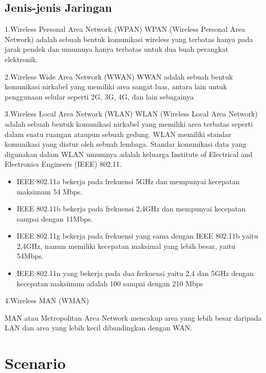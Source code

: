 \documentclass[conference]{IEEEtran}
\begin{document}
\subsection{Jenis-jenis Jaringan}
1.Wireless Personal Area Network (WPAN)
WPAN (Wireless Personal Area Network) adalah sebuah bentuk komunikasi wireless yang terbatas hanya pada jarak pendek dan umumnya hanya terbatas untuk dua buah perangkat elektronik.
\vspace{5pt}

2.Wireless Wide Area Network (WWAN)
WWAN adalah sebuah bentuk komunikasi nirkabel yang memiliki area sangat luas, antara lain untuk penggunaan selular seperti 2G, 3G, 4G, dan lain sebagainya
\vspace{5pt}

3.Wireless Local Area Network (WLAN)
WLAN (Wireless Local Area Network) adalah sebuah bentuk komunikasi nirkabel yang memiliki area terbatas seperti dalam suatu ruangan ataupun sebuah gedung. WLAN memiliki standar komunikasi yang diatur oleh sebuah lembaga. Standar komunikasi data yang digunakan dalam WLAN umumnya adalah keluarga Institute of Electrical and Electronics Engineers (IEEE) 802.11.
\begin{itemize}
    \item  IEEE 802.11a bekerja pada frekuensi 5GHz dan mempunyai kecepatan maksimum 54 Mbps.
    \item IEEE 802.11b bekerja pada frekuensi 2,4GHz dan mempunyai kecepatan sampai dengan 11Mbps.
    \item IEEE 802.11g bekerja pada frekuensi yang sama dengan IEEE 802.11b yaitu 2,4GHz, namun memiliki kecepatan maksimal yang lebih besar, yaitu 54Mbps.
    \item   IEEE 802.11n yang bekerja pada dua frekuensi yaitu 2,4 dan 5GHz dengan kecepatan maksimum adalah 100 sampai dengan 210 Mbps
\end{itemize}
\vspace{5pt}

4.Wireless MAN (WMAN)
\vspace{1pt}

MAN atau Metropolitan Area Network mencakup area yang lebih besar daripada LAN dan area yang lebih kecil dibandingkan dengan WAN.
\section{Scenario}



\begin{figure}[htbp]
    
\end{figure}
\end{document}

